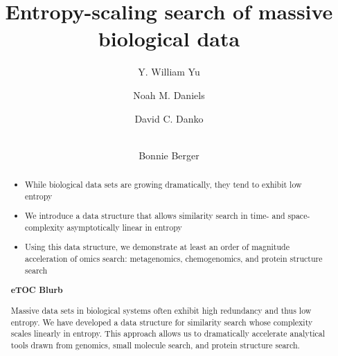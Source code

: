 \documentclass[review,preprint,12pt]{elsarticle}
\theoremstyle{definition}
\theoremstyle{remark}
\numberwithin{equation}{section}
\begin{document}
\begin{frontmatter}

\title{ %
Entropy-scaling search of massive biological data}

\author[mitmath,mitcsail]{Y. William Yu}
\author[mitmath,mitcsail]{Noah M. Daniels}
\author[mitcsail]{David C. Danko}
\author[mitmath,mitcsail]{\\Bonnie Berger}
\address[mitmath]{Department of Mathematics, Massachusetts Institute of Technology, Cambridge, Massachusetts 02139}
\address[mitcsail]{Computer Science and AI Lab, Massachusetts Institute of Technology, Cambridge, Massachusetts 02139}






\begin{abstract}
    \begin{itemize}
        \item While biological data sets are growing dramatically, they tend to exhibit low entropy
        \item We introduce a data structure that allows similarity search in time- and space-complexity asymptotically linear in entropy
        \item Using this data structure, we demonstrate at least an order of magnitude acceleration of omics search: metagenomics, chemogenomics, and protein structure search
    \end{itemize}
\noindent\unskip\textbf{eTOC Blurb}
\par\medskip\noindent\unskip\ignorespaces
Massive data sets in biological systems often exhibit high redundancy and thus low entropy.
We have developed a data structure for similarity search whose complexity scales linearly in entropy.
This approach allows us to dramatically accelerate analytical tools drawn from genomics, small molecule search, and protein structure search.
\end{abstract}

\end{frontmatter}
\end{document}
